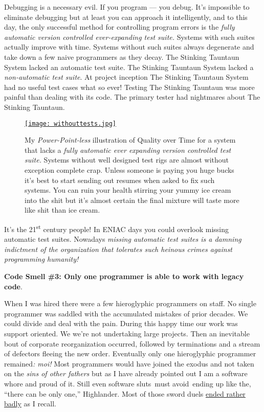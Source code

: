 Debugging is a necessary evil. If you program --- you debug. It's
impossible to eliminate debugging but at least you can approach it
intelligently, and to this day, the only successful method for
controlling program errors is the \emph{fully automatic version
controlled ever-expanding test suite.} Systems with such suites actually
improve with time. Systems without such suites always degenerate and
take down a few naive programmers as they decay. The Stinking Tauntaun
System lacked an automatic test suite. The Stinking Tauntaun System
lacked a \emph{non-automatic test suite}. At project inception The Stinking Tauntaun System had no
useful test cases what so ever! Testing The Stinking Tauntaun was more
painful than dealing with its code. The primary tester had nightmares
about The Stinking Tauntaun.


\begin{figure}[htbp]
\centering
\href{https://bakerjd99.wordpress.com/2015/04/12/cutting-the-stinking-tauntaun-and-other-adventures-in-software-archeology/withouttests/}{\texttt{[image: withouttests.jpg]}}
\caption[My \emph{Power-Point-less} illustration of Quality over Time for a system that
lacks a version controlled test suite]{My \emph{Power-Point-less} illustration of Quality over Time for a system that
lacks a \emph{fully automatic ever expanding version controlled test suite.}
Systems without well designed test rigs are almost without exception
complete crap. Unless someone is paying you huge bucks it's best to
start sending out resumes when asked to fix such systems. You can ruin
your health stirring your yummy ice cream into the shit but it's almost
certain the final mixture will taste more like shit than
ice cream.}
\label{fig:4971X1}
\end{figure}



It's the 21\textsuperscript{st} century people! In ENIAC days you could
overlook missing automatic test suites. Nowadays \emph{missing automatic
test suites is a damning indictment of the organization that tolerates
such heinous crimes against programming humanity!}

\medskip
\noindent\textbf{Code Smell \#3: Only one programmer is able to work with legacy
code}.
\medskip

When I was hired there were a few hieroglyphic programmers on staff. No
single programmer was saddled with the accumulated mistakes of prior
decades. We could divide and deal with the pain. During this happy time
our work was support oriented. We we're not undertaking large projects.
Then an inevitable bout of corporate reorganization occurred, followed
by terminations and a stream of defectors fleeing the new order.
Eventually only one hieroglyphic programmer remained\emph{: moi!} Most
programmers would have joined the exodus and not taken on the \emph{sins
of other fathers} but as I have already pointed out I am a software
whore and proud of it. Still even software sluts~must avoid~ending up
like the, ``there can be only one,'' Highlander. Most of those sword
duels \href{https://www.youtube.com/watch?v=_j6_H-PSml0}{ended rather
badly} as I recall.

